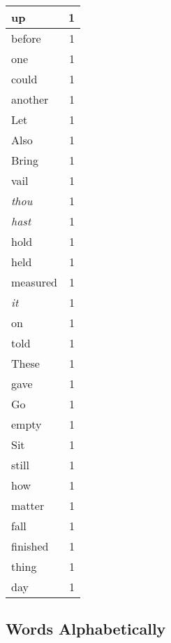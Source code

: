 \begin{center}
\begin{longtable}{l|r}
up & 1 \\ \hline
before & 1 \\ \hline
one & 1 \\ \hline
could & 1 \\ \hline
another & 1 \\ \hline
Let & 1 \\ \hline
Also & 1 \\ \hline
Bring & 1 \\ \hline
vail & 1 \\ \hline
\emph{thou} & 1 \\ \hline
\emph{hast} & 1 \\ \hline
hold & 1 \\ \hline
held & 1 \\ \hline
measured & 1 \\ \hline
\emph{it} & 1 \\ \hline
on & 1 \\ \hline
told & 1 \\ \hline
These & 1 \\ \hline
gave & 1 \\ \hline
Go & 1 \\ \hline
empty & 1 \\ \hline
Sit & 1 \\ \hline
still & 1 \\ \hline
how & 1 \\ \hline
matter & 1 \\ \hline
fall & 1 \\ \hline
finished & 1 \\ \hline
thing & 1 \\ \hline
day & 1 \\ \hline
\end{longtable}
\end{center}



\normalsize



\subsection{Words Alphabetically}

